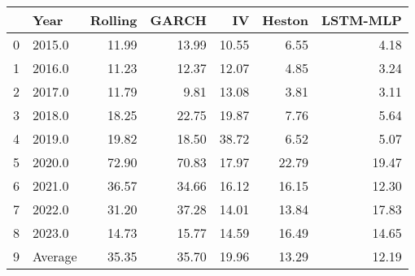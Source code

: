 \begin{tabular}{llrrrrr}
\toprule
{} &     Year &  Rolling &  GARCH &     IV &  Heston &  LSTM-MLP \\
\midrule
0 &   2015.0 &    11.99 &  13.99 &  10.55 &    6.55 &      4.18 \\
1 &   2016.0 &    11.23 &  12.37 &  12.07 &    4.85 &      3.24 \\
2 &   2017.0 &    11.79 &   9.81 &  13.08 &    3.81 &      3.11 \\
3 &   2018.0 &    18.25 &  22.75 &  19.87 &    7.76 &      5.64 \\
4 &   2019.0 &    19.82 &  18.50 &  38.72 &    6.52 &      5.07 \\
5 &   2020.0 &    72.90 &  70.83 &  17.97 &   22.79 &     19.47 \\
6 &   2021.0 &    36.57 &  34.66 &  16.12 &   16.15 &     12.30 \\
7 &   2022.0 &    31.20 &  37.28 &  14.01 &   13.84 &     17.83 \\
8 &   2023.0 &    14.73 &  15.77 &  14.59 &   16.49 &     14.65 \\
9 &  Average &    35.35 &  35.70 &  19.96 &   13.29 &     12.19 \\
\bottomrule
\end{tabular}
